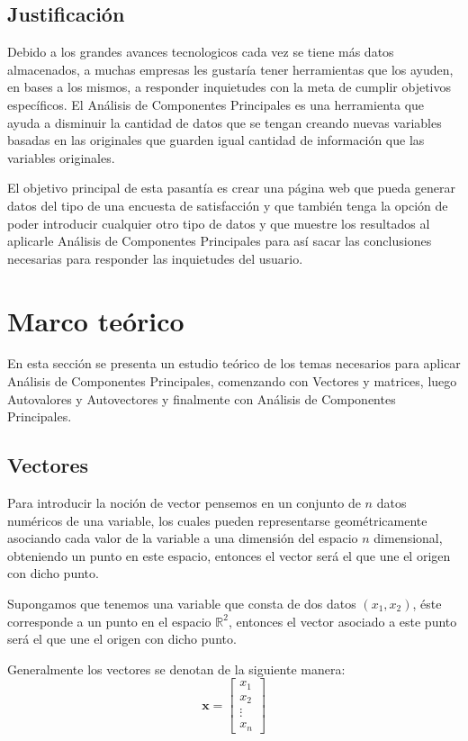 \documentclass[12pt,letterpaper]{report} %
\begin{document}
\section{Justificación}

Debido a los grandes avances tecnologicos cada vez se tiene más datos almacenados, a muchas empresas les gustaría tener herramientas que los ayuden, en bases a los mismos, a responder inquietudes con la meta de cumplir objetivos específicos. El Análisis de Componentes Principales es una herramienta que ayuda a disminuir la cantidad de datos que se tengan creando nuevas variables basadas en las originales que guarden igual cantidad de información que las variables originales.

El objetivo principal de esta pasantía es crear una página web que pueda generar datos del tipo de una encuesta de satisfacción y que también tenga la opción de poder introducir cualquier otro tipo de datos y que muestre los resultados al aplicarle Análisis de Componentes Principales para así sacar las conclusiones necesarias para responder las inquietudes del usuario.

\newpage

\chapter{Marco teórico}

En esta sección se presenta un estudio teórico de los temas necesarios para aplicar Análisis de Componentes Principales, comenzando con Vectores y matrices, luego Autovalores y Autovectores y finalmente con Análisis de Componentes Principales.

\section{Vectores}

Para introducir la noción de vector pensemos en un conjunto de $n$ datos numéricos de una variable, los cuales pueden representarse geométricamente asociando cada valor de la variable a una dimensión del espacio $n$ dimensional, obteniendo un punto en este espacio, entonces el vector será el que une el origen con dicho punto. 

Supongamos que tenemos una variable que consta de dos datos $(x_1,x_2)$, éste corresponde a un punto en el espacio $\mathbb{R}^2$, entonces el vector asociado a este punto será el que une el origen con dicho punto.

Generalmente los vectores se denotan de la siguiente manera:
$$
\mathbf{x}=
\begin{bmatrix} 
x_1 \\ 
x_2 \\ 
\vdots 
\\ 
x_n
\end{bmatrix}
$$
\end{document}
